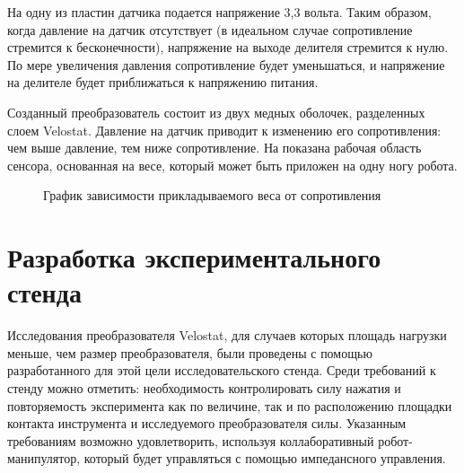 На одну из пластин датчика подается напряжение 3,3 вольта. Таким образом, когда давление на датчик отсутствует (в идеальном случае сопротивление стремится к бесконечности), напряжение на выходе делителя стремится к нулю. По мере увеличения давления сопротивление будет уменьшаться, и напряжение на делителе будет приближаться к напряжению питания.


Созданный преобразователь состоит из двух медных оболочек, разделенных слоем Velostat. Давление на датчик приводит к изменению его сопротивления: чем выше давление, тем ниже сопротивление. На  показана рабочая область сенсора, основанная на весе, который может быть приложен на одну ногу робота.
\begin{figure}[h]
    \centering
    \caption{График зависимости прикладываемого веса от сопротивления}
    \label{fig:velostat_pressure_resistance.jpg}
\end{figure}

\section{Разработка экспериментального стенда}

Исследования преобразователя Velostat, для случаев которых площадь нагрузки меньше, чем размер преобразователя, были проведены с помощью разработанного для этой цели исследовательского стенда. Среди требований к стенду можно отметить: необходимость контролировать силу нажатия и повторяемость эксперимента как по величине, так и по расположению площадки контакта инструмента и исследуемого преобразователя силы. Указанным требованиям возможно удовлетворить, используя коллаборативный робот-манипулятор, который будет управляться с помощью импедансного управления.

